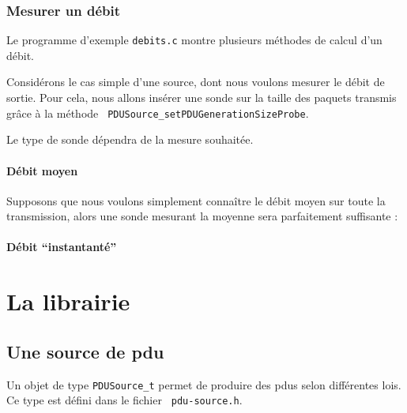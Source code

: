 \documentclass{article}
\begin{document}
\subsubsection{Mesurer un débit}

   Le programme d'exemple {\tt debits.c} montre plusieurs méthodes de
calcul d'un débit.

   Considérons le cas simple d'une source, dont nous voulons mesurer
le débit de sortie. Pour cela, nous allons insérer une sonde sur la
taille des paquets transmis grâce à la méthode {\tt
  PDUSource\_setPDUGenerationSizeProbe}.

   Le type de sonde dépendra de la mesure souhaitée.

%
\paragraph{Débit moyen}

   Supposons que nous voulons simplement connaître le débit moyen sur
toute la transmission, alors une sonde mesurant la moyenne sera parfaitement
suffisante :

%
\paragraph{Débit ``instantanté''}

%
\section{La librairie}

%
\subsection{Une source de {\sc pdu}}

   Un objet de type {\tt PDUSource\_t} permet de produire des {\sc
pdu}s selon différentes lois.  Ce type est défini dans le fichier {\tt
     pdu-source.h}. 
\end{document}

